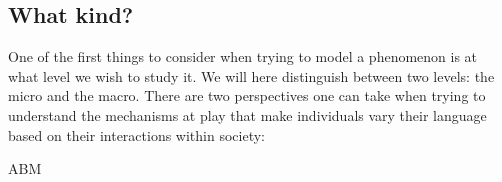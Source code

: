 \documentclass[../thesis.tex]{subfiles}
\begin{document}
\subsection{What kind?}
One of the first things to consider when trying to model a phenomenon is at what level we wish to study it. %
We will here distinguish between two levels: the micro and the macro. 
There are two perspectives one can take when trying to understand the mechanisms at play that make individuals vary their language based on their interactions within society: 



\ac{ABM}
\end{document}
